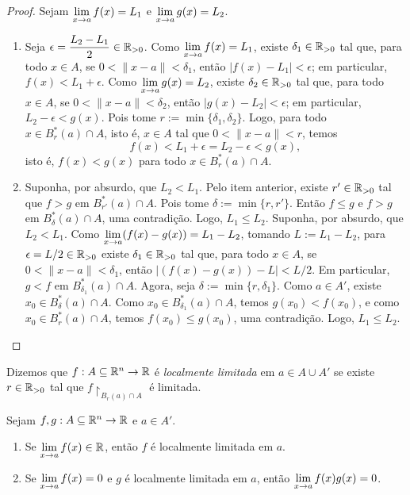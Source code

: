 \begin{proof}
    Sejam $\displaystyle \lim_{x \to a} f(x) = L_1$ e $\displaystyle \lim_{x \to a} g(x) = L_2$.
        \begin{enumerate}[leftmargin=*, align=left, label=\textbf{(\alph*)}]
            \item Seja $\displaystyle \epsilon = \dfrac{L_2 - L_1}{2} \in \mathbb{R}_{>0}$. Como $\displaystyle \lim_{x \to a} f(x) = L_1$, existe $\delta_1 \in \mathbb{R}_{>0}$ tal que, para todo $x \in A$, se $0<\|x-a\|<\delta_1$, então $|f(x) - L_1| < \epsilon$; em particular, $f(x) < L_1 + \epsilon$. Como $\displaystyle \lim_{x \to a} g(x) = L_2$, existe $\delta_2 \in \mathbb{R}_{>0}$ tal que, para todo $x \in A$, se $0<\|x-a\|<\delta_2$, então $|g(x) - L_2| < \epsilon$; em particular, $L_2 - \epsilon < g(x)$. Pois tome $r := \min \{\delta_1, \delta_2 \}$. Logo, para todo $x \in B^*_r(a) \cap A$, isto é, $x \in A$ tal que $0 < \|x-a\| < r$, temos
                \[
                    f(x) < L_1 + \epsilon = L_2 - \epsilon < g(x),
                \]
            isto é, $f(x) < g(x)$ para todo $x \in B^*_r(a) \cap A$. \blackproof
            \item Suponha, por absurdo, que $L_2 < L_1$. Pelo item anterior, existe $r' \in \mathbb{R}_{>0}$ tal que $f > g$ em $B^*_{r'}(a) \cap A$. Pois tome $\delta := \min \{r, r'\}$. Então $f \leq g$ e $f > g$ em $B^*_{\delta}(a) \cap A$, uma contradição. Logo, $L_1 \leq L_2$. \blackproof
            \repeatitem Suponha, por absurdo, que $L_2 < L_1$. Como $\displaystyle \lim_{x \to a} (f(x) - g(x)) = L_1 - L_2$, tomando $L:= L_1 - L_2$, para $\epsilon = L/2 \in \mathbb{R}_{>0}$ existe $\delta_1 \in \mathbb{R}_{>0}$ tal que, para todo $x \in A$, se $0<\|x-a\|<\delta_1$, então $|(f(x) - g(x)) - L| < L/2$. Em particular, $g < f$ em $B^*_{\delta_1}(a) \cap A$. Agora, seja $\delta := \min \{r, \delta_1\}$. Como $a \in A'$, existe $x_0 \in B^*_{\delta}(a) \cap A$. Como $x_0 \in B^*_{\delta_1}(a) \cap A$, temos $g(x_0) < f(x_0)$, e como $x_0 \in B^*_{r}(a) \cap A$, temos $f(x_0) \leq g(x_0)$, uma contradição. Logo, $L_1 \leq L_2$. \blackproof
        \end{enumerate}
\end{proof}

\begin{definition}
    Dizemos que $f : A \subseteq \mathbb{R}^n \to \mathbb{R}$ é \emph{localmente limitada} em $a \in A \cup A'$ se existe $r \in \mathbb{R}_{>0}$ tal que $f \restriction_{B_r(a) \cap A}$ é limitada.
\end{definition}

\begin{proposition}
    Sejam $f,g : A \subseteq \mathbb{R}^n \to \mathbb{R}$ e $a \in A'$.
        \begin{enumerate}[leftmargin=*, align=left, label=\textbf{(\alph*)}]
            \item Se $\displaystyle \lim_{x \to a} f(x) \in \mathbb{R}$, então $f$ é localmente limitada em $a$.
            \item Se $\displaystyle \lim_{x \to a} f(x) = 0$ e $g$ é localmente limitada em $a$, então $\displaystyle \lim_{x \to a} f(x)g(x) = 0$.
        \end{enumerate}
\end{proposition}

